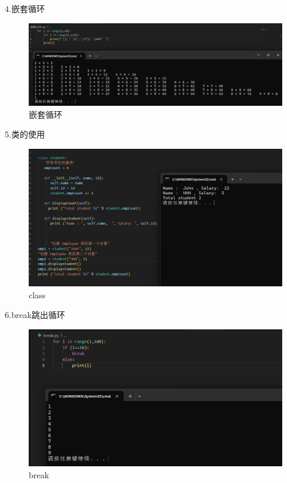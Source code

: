 \documentclass[a4paper, 12pt]{article}
\begin{document}
4.嵌套循环
    \begin{figure}[H]
  \centering
  \includegraphics[width=1\textwidth]{屏幕截图 2024-09-12 101626.png}
  \caption{嵌套循环}
    \end{figure}

5.类的使用
 \begin{figure}[H]
  \centering
  \includegraphics[width=1\textwidth]{屏幕截图 2024-09-12 120300.png}
  \caption{class}
    \end{figure}

6.break跳出循环
 \begin{figure}[H]
  \centering
  \includegraphics[width=1\textwidth]{屏幕截图 2024-09-12 102808.png}
  \caption{break}
    \end{figure}
\end{document}
